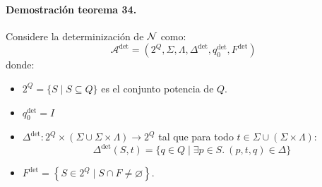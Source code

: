 \paragraph{Demostración teorema 34.} Considere la determinización de $\mathcal{N}$ como:
$$
\mathcal{A}^{\text{det}}=\left(2^Q, \Sigma, \Lambda, \Delta^{\text{det}}, q_0^{\text{det}}, F^{\text{det}}\right)
$$
donde:
\begin{itemize}
    \item $2^Q=\{S \mid S \subseteq Q\}$ es el conjunto potencia de $Q$.
    \item $q_0^{\text{det}}=I$
    \item $\Delta^{\operatorname{det}}: 2^Q \times(\Sigma \cup \Sigma \times \Lambda) \rightarrow 2^Q$ tal que para todo $t \in \Sigma \cup(\Sigma \times \Lambda)$:
    $$
    \Delta^{\text{det}}(S, t)=\{q \in Q \mid \exists p \in S.\ (p, t, q) \in \Delta\}
    $$
    \item $F^{\text{det}}=\left\{S \in 2^Q \mid S \cap F \neq \varnothing\right\}$.
\end{itemize}









